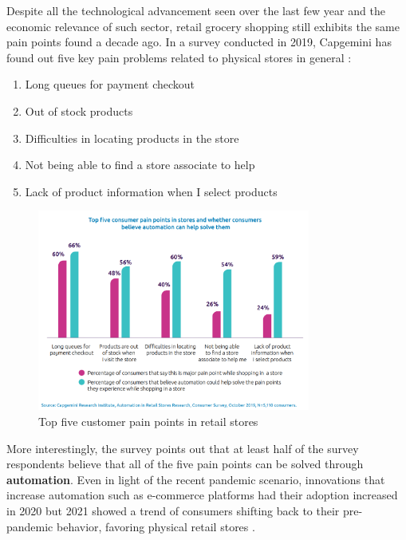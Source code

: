 \documentclass[openright]{normas-utf-tex} %
\begin{document}
Despite all the technological advancement seen over the last few year and the
economic relevance of such sector, retail grocery shopping still exhibits the
same pain points found a decade ago. In a survey conducted in 2019, Capgemini
has found out five key pain problems related to physical stores in general
\cite{Capgemini2020}:

\begin{enumerate}
        \item Long queues for payment checkout
        \item Out of stock products
        \item Difficulties in locating products in the store
        \item Not being able to find a store associate to help
        \item Lack of product information when I select products
\end{enumerate}

\begin{figure}[H]
	\centering
	\includegraphics[width=0.8\textwidth]{./images/painpoints.png}
    \caption[Top five customer pain points in retail stores]{Top five customer pain points in retail stores}
    \label{fig:capgemini}
\end{figure}

More interestingly, the survey points out that at least half of the survey
respondents believe that all of the five pain points can be solved through
\textbf{automation}. Even in light of the recent pandemic scenario, innovations
that increase automation such as e-commerce platforms had their adoption
increased in 2020 but 2021 showed a trend of consumers shifting
back to their pre-pandemic behavior, favoring physical retail stores
\cite{Kantar2022}.
\end{document}
